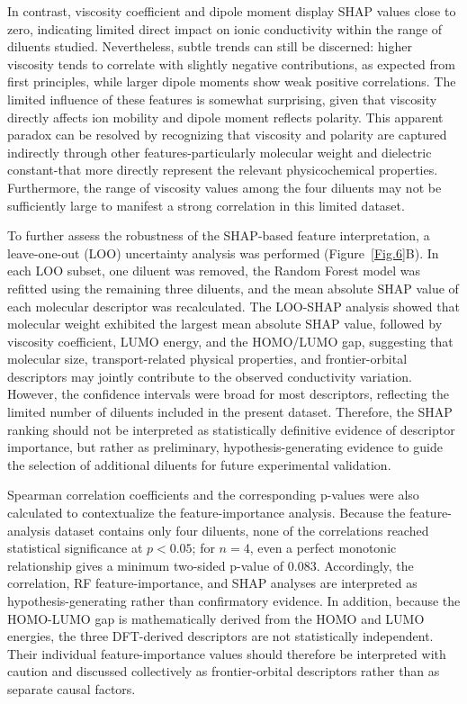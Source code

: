\documentclass[11pt, a4paper]{article}
\begin{document}
In contrast, viscosity coefficient and dipole moment display SHAP values close to zero, indicating limited direct impact on ionic conductivity within the range of diluents studied. Nevertheless, subtle trends can still be discerned: higher viscosity tends to correlate with slightly negative contributions, as expected from first principles, while larger dipole moments show weak positive correlations. The limited influence of these features is somewhat surprising, given that viscosity directly affects ion mobility and dipole moment reflects polarity. This apparent paradox can be resolved by recognizing that viscosity and polarity are captured indirectly through other features-particularly molecular weight and dielectric constant-that more directly represent the relevant physicochemical properties. Furthermore, the range of viscosity values among the four diluents may not be sufficiently large to manifest a strong correlation in this limited dataset.

To further assess the robustness of the SHAP-based feature interpretation, a leave-one-out (LOO) uncertainty analysis was performed (Figure~\ref{Fig.6}B). In each LOO subset, one diluent was removed, the Random Forest model was refitted using the remaining three diluents, and the mean absolute SHAP value of each molecular descriptor was recalculated. The LOO-SHAP analysis showed that molecular weight exhibited the largest mean absolute SHAP value, followed by viscosity coefficient, LUMO energy, and the HOMO/LUMO gap, suggesting that molecular size, transport-related physical properties, and frontier-orbital descriptors may jointly contribute to the observed conductivity variation. However, the confidence intervals were broad for most descriptors, reflecting the limited number of diluents included in the present dataset. Therefore, the SHAP ranking should not be interpreted as statistically definitive evidence of descriptor importance, but rather as preliminary, hypothesis-generating evidence to guide the selection of additional diluents for future experimental validation.

Spearman correlation coefficients and the corresponding p-values were also calculated to contextualize the feature-importance analysis. Because the feature-analysis dataset contains only four diluents, none of the correlations reached statistical significance at $p < 0.05$; for $n = 4$, even a perfect monotonic relationship gives a minimum two-sided p-value of 0.083. Accordingly, the correlation, RF feature-importance, and SHAP analyses are interpreted as hypothesis-generating rather than confirmatory evidence. In addition, because the HOMO-LUMO gap is mathematically derived from the HOMO and LUMO energies, the three DFT-derived descriptors are not statistically independent. Their individual feature-importance values should therefore be interpreted with caution and discussed collectively as frontier-orbital descriptors rather than as separate causal factors.
\end{document}
